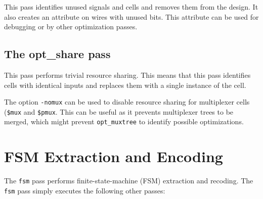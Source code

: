 This pass identifies unused signals and cells and removes them from the design. It also
creates an  attribute on wires with unused bits. This attribute can be
used for debugging or by other optimization passes.

\subsection{The opt\_share pass}

This pass performs trivial resource sharing. This means that this pass identifies cells
with identical inputs and replaces them with a single instance of the cell.

The option {\tt -nomux} can be used to disable resource sharing for multiplexer
cells ({\tt \$mux} and {\tt \$pmux}. This can be useful as
it prevents multiplexer trees to be merged, which might prevent {\tt opt\_muxtree}
to identify possible optimizations.

\section{FSM Extraction and Encoding}

The {\tt fsm} pass performs finite-state-machine (FSM) extraction and recoding. The {\tt fsm}
pass simply executes the following other passes:

